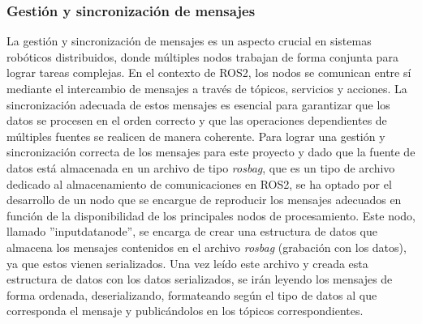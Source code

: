 \documentclass[12pt, a4paper, twoside]{article}
\begin{document}
\subsubsection{Gestión y sincronización de mensajes}
La gestión y sincronización de mensajes es un aspecto crucial en sistemas robóticos distribuidos, donde múltiples nodos trabajan de forma 
conjunta para lograr tareas complejas. En el contexto de ROS2\cite{doi:10.1126/scirobotics.abm6074}, los nodos se comunican entre sí mediante el intercambio de mensajes a
través de tópicos, servicios y acciones. La sincronización adecuada de estos mensajes es esencial para garantizar que los datos se procesen 
en el orden correcto y que las operaciones dependientes de múltiples fuentes se realicen de manera coherente. \newline
Para lograr una gestión y sincronización correcta de los mensajes para este proyecto y dado que la fuente de datos está almacenada en un 
archivo de tipo \textit{rosbag}, que es un tipo de archivo dedicado al almacenamiento de comunicaciones en ROS2\cite{doi:10.1126/scirobotics.abm6074}, 
se ha optado por el desarrollo de un nodo que se encargue de reproducir los mensajes adecuados en función de la disponibilidad de los principales nodos de procesamiento.\newline
Este nodo, llamado ''input\textunderscore data\textunderscore node'', se encarga de crear una estructura de datos que almacena los mensajes contenidos 
en el archivo \textit{rosbag} (grabación con los datos), ya que estos vienen serializados. Una vez leído este archivo y creada esta estructura de datos con los 
datos serializados, se irán leyendo los mensajes de forma ordenada, deserializando, formateando según el tipo de datos al que corresponda el mensaje 
y publicándolos en los tópicos correspondientes.
\end{document}
